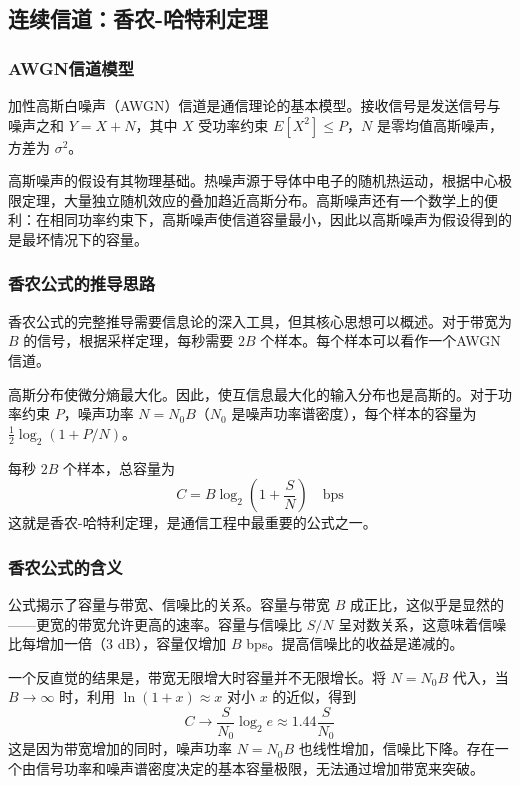 \subsection{连续信道：香农-哈特利定理}

\subsubsection{AWGN信道模型}

加性高斯白噪声（AWGN）信道是通信理论的基本模型。接收信号是发送信号与噪声之和 $Y = X + N$，其中 $X$ 受功率约束 $E[X^2] \leq P$，$N$ 是零均值高斯噪声，方差为 $\sigma^2$。

高斯噪声的假设有其物理基础。热噪声源于导体中电子的随机热运动，根据中心极限定理，大量独立随机效应的叠加趋近高斯分布。高斯噪声还有一个数学上的便利：在相同功率约束下，高斯噪声使信道容量最小，因此以高斯噪声为假设得到的是最坏情况下的容量。

\subsubsection{香农公式的推导思路}

香农公式的完整推导需要信息论的深入工具，但其核心思想可以概述。对于带宽为 $B$ 的信号，根据采样定理，每秒需要 $2B$ 个样本。每个样本可以看作一个AWGN信道。

高斯分布使微分熵最大化。因此，使互信息最大化的输入分布也是高斯的。对于功率约束 $P$，噪声功率 $N = N_0 B$（$N_0$ 是噪声功率谱密度），每个样本的容量为 $\frac{1}{2}\log_2(1 + P/N)$。

每秒 $2B$ 个样本，总容量为
\begin{equation}
    C = B \log_2\left(1 + \frac{S}{N}\right) \quad \text{bps}
\end{equation}
这就是香农-哈特利定理，是通信工程中最重要的公式之一。

\subsubsection{香农公式的含义}

公式揭示了容量与带宽、信噪比的关系。容量与带宽 $B$ 成正比，这似乎是显然的——更宽的带宽允许更高的速率。容量与信噪比 $S/N$ 呈对数关系，这意味着信噪比每增加一倍（3 dB），容量仅增加 $B$ bps。提高信噪比的收益是递减的。

一个反直觉的结果是，带宽无限增大时容量并不无限增长。将 $N = N_0 B$ 代入，当 $B \to \infty$ 时，利用 $\ln(1+x) \approx x$ 对小 $x$ 的近似，得到
\begin{equation}
    C \to \frac{S}{N_0} \log_2 e \approx 1.44 \frac{S}{N_0}
\end{equation}
这是因为带宽增加的同时，噪声功率 $N = N_0 B$ 也线性增加，信噪比下降。存在一个由信号功率和噪声谱密度决定的基本容量极限，无法通过增加带宽来突破。

